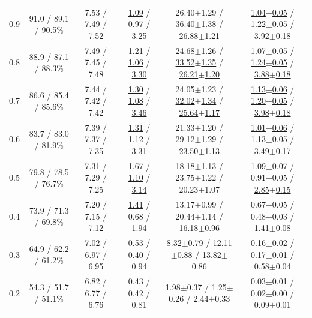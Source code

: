 \begin{table}[!t]
\begin{tabular}{cccccc}
0.9 & 91.0 / 89.1 / 90.5\% & 7.53 / 7.49 / 7.52 & \underline{1.09} / 0.97 / \underline{3.25} & 26.40{\scriptsize$\pm$1.29} / \underline{36.40{\scriptsize$\pm$1.38}} / \underline{26.88{\scriptsize$\pm$1.21}} & \underline{1.04{\scriptsize$\pm$0.05}} / \underline{1.22{\scriptsize$\pm$0.05}} / \underline{3.92{\scriptsize$\pm$0.18}} \\
0.8 & 88.9 / 87.1 / 88.3\% & 7.49 / 7.45 / 7.48 & \underline{1.21} / \underline{1.06} / \underline{3.30} & 24.68{\scriptsize$\pm$1.26} / \underline{33.52{\scriptsize$\pm$1.35}} / \underline{26.21{\scriptsize$\pm$1.20}} & \underline{1.07{\scriptsize$\pm$0.05}} / \underline{1.24{\scriptsize$\pm$0.05}} / \underline{3.88{\scriptsize$\pm$0.18}} \\
0.7 & 86.6 / 85.4 / 85.6\% & 7.44 / 7.42 / 7.42 & \underline{1.30} / \underline{1.08} / \underline{3.46} & 24.05{\scriptsize$\pm$1.23} / \underline{32.02{\scriptsize$\pm$1.34}} / \underline{25.64{\scriptsize$\pm$1.17}} & \underline{1.13{\scriptsize$\pm$0.06}} / \underline{1.20{\scriptsize$\pm$0.05}} / \underline{3.98{\scriptsize$\pm$0.18}} \\
0.6 & 83.7 / 83.0 / 81.9\% & 7.39 / 7.37 / 7.35 & \underline{1.31} / \underline{1.12} / \underline{3.31} & 21.33{\scriptsize$\pm$1.20} / \underline{29.12{\scriptsize$\pm$1.29}} / \underline{23.50{\scriptsize$\pm$1.13}} & \underline{1.01{\scriptsize$\pm$0.06}} / \underline{1.13{\scriptsize$\pm$0.05}} / \underline{3.49{\scriptsize$\pm$0.17}} \\
0.5 & 79.8 / 78.5 / 76.7\% & 7.31 / 7.29 / 7.25 & \underline{1.67} / \underline{1.10} / \underline{3.14} & 18.18{\scriptsize$\pm$1.13} / 23.75{\scriptsize$\pm$1.22} / 20.23{\scriptsize$\pm$1.07} & \underline{1.09{\scriptsize$\pm$0.07}} / 0.91{\scriptsize$\pm$0.05} / \underline{2.85{\scriptsize$\pm$0.15}} \\
0.4 & 73.9 / 71.3 / 69.8\% & 7.20 / 7.15 / 7.12 & \underline{1.41} / 0.68 / \underline{1.94} & 13.17{\scriptsize$\pm$0.99} / 20.44{\scriptsize$\pm$1.14} / 16.18{\scriptsize$\pm$0.96} & 0.67{\scriptsize$\pm$0.05} / 0.48{\scriptsize$\pm$0.03} / \underline{1.41{\scriptsize$\pm$0.08}} \\
0.3 & 64.9 / 62.2 / 61.2\% & 7.02 / 6.97 / 6.95 & 0.53 / 0.40 / 0.94 & 8.32{\scriptsize$\pm$0.79} / 12.11{\scriptsize$\pm$0.88} / 13.82{\scriptsize$\pm$0.86} & 0.16{\scriptsize$\pm$0.02} / 0.17{\scriptsize$\pm$0.01} / 0.58{\scriptsize$\pm$0.04} \\
0.2 & 54.3 / 51.7 / 51.1\% & 6.82 / 6.77 / 6.76 & 0.43 / 0.42 / 0.81 & 1.98{\scriptsize$\pm$0.37} / 1.25{\scriptsize$\pm$0.26} / 2.44{\scriptsize$\pm$0.33} & 0.03{\scriptsize$\pm$0.01} / 0.02{\scriptsize$\pm$0.00} / 0.09{\scriptsize$\pm$0.01} \\

\end{tabular}
\end{table}
